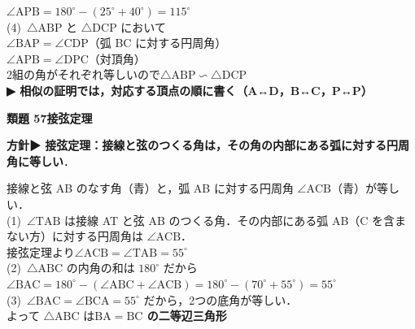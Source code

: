 \documentclass[a4paper,11pt]{ltjsarticle}
\newcommand{\ans}[2]{\Needspace{5\baselineskip}\vspace{6pt}%
  {\sffamily\bfseries 類題 #1\quad #2}\par}
\newcommand{\point}[1]{\textsf{\bfseries ▶ #1}}
\begin{document}
\begin{kai}
\hspace*{1.5em}$\angle\mathrm{APB}=180^\circ-(25^\circ+40^\circ)=115^\circ$\\[2pt]
(4)\ $\triangle\mathrm{ABP}$ と $\triangle\mathrm{DCP}$ において\\
\hspace*{1.5em}$\angle\mathrm{BAP}=\angle\mathrm{CDP}$\quad（弧 BC に対する円周角）\\
\hspace*{1.5em}$\angle\mathrm{APB}=\angle\mathrm{DPC}$\quad（対頂角）\\
\hspace*{1.5em}2組の角がそれぞれ等しいので\quad $\triangle\mathrm{ABP}\backsim\triangle\mathrm{DCP}$\\
\hspace*{1.5em}\point{相似の証明では，対応する頂点の順に書く（A↔D，B↔C，P↔P）}
\end{kai}

\ans{57}{接弦定理}
\begin{kai}
\textbf{方針}\quad \point{接弦定理：接線と弦のつくる角は，その角の内部にある弧に対する円周角に等しい}．\\[2pt]
\begin{center}
\end{center}
\hspace*{1.5em}接線と弦 AB のなす角（青）と，弧 AB に対する円周角 $\angle\mathrm{ACB}$（青）が等しい．\\
(1)\ $\angle\mathrm{TAB}$ は接線 AT と弦 AB のつくる角．その内部にある弧 AB（C を含まない方）に対する円周角は $\angle\mathrm{ACB}$．\\
\hspace*{1.5em}接弦定理より\quad $\angle\mathrm{ACB}=\angle\mathrm{TAB}=55^\circ$\\[2pt]
(2)\ $\triangle\mathrm{ABC}$ の内角の和は $180^\circ$ だから\\
\hspace*{1.5em}$\angle\mathrm{BAC}=180^\circ-(\angle\mathrm{ABC}+\angle\mathrm{ACB})=180^\circ-(70^\circ+55^\circ)=55^\circ$\\[2pt]
(3)\ $\angle\mathrm{BAC}=\angle\mathrm{BCA}=55^\circ$ だから，2つの底角が等しい．\\
\hspace*{1.5em}よって $\triangle\mathrm{ABC}$ は\quad \textbf{$\mathrm{BA}=\mathrm{BC}$ の二等辺三角形}
\end{kai}
\end{document}
